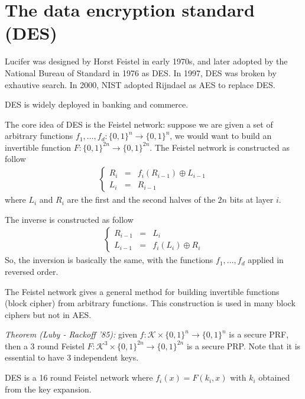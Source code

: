 \documentclass{article}
\begin{document}
\section{The data encryption standard (DES)}

Lucifer was designed by Horst Feistel in early 1970s, and later  adopted by the
National Bureau of Standard in  1976 as DES. In 1997, DES was broken by
exhautive search. In 2000, NIST adopted Rijndael as AES to replace DES.

DES is widely deployed in banking and commerce.

The core idea of DES is the Feistel network: suppose we are given a set of
arbitrary functions $f_1, \dotsc, f_d: \lbrace 0, 1 \rbrace^n \to \lbrace 0, 1
\rbrace^n$, we would want to build an invertible function $F: \lbrace 0, 1
\rbrace^{2 n} \to \lbrace 0, 1 \rbrace^{2n}$. The Feistel network is constructed
as follow
\begin{eqnarray}
  \left\lbrace \begin{array}{ccl}
      R_i & = & f_i (R_{i-1} ) \oplus L_{i-1}\\
      L_i & = & R_{i-1}
    \end{array}\right. 
\end{eqnarray}
where $L_i$ and $R_i$ are the first and the second halves of the $2n$ bits at
layer $i$.

The inverse is constructed as follow
\begin{eqnarray}
  \left\lbrace \begin{array}{ccl}
      R_{i-1} &=& L_i \\
      L_{i-1} &=& f_i(L_i) \oplus R_i
    \end{array}\right.
\end{eqnarray}
So, the inversion is basically the same, with the functions $f_1, \dotsc, f_d$
applied in reversed order.

The Feistel network gives a general method for building invertible functions
(block cipher) from arbitrary functions. This construction is used in many block
ciphers but not in AES.

\emph{Theorem (Luby - Rackoff '85):} given $f: \mathcal{K} \times \lbrace 0, 1
\rbrace^n \to \lbrace 0, 1 \rbrace^n$ is a secure PRF, then a 3 round Feistel
$F: \mathcal{K}^3 \times \lbrace 0, 1 \rbrace^{2 n} \to \lbrace 0, 1
\rbrace^{2n}$ is a secure PRP. Note that it is essential to have 3 independent
keys. 

DES is a 16 round Feistel network where $f_i(x) = F(k_i, x) $ with $k_i$
obtained from the key expansion. 
\end{document}
